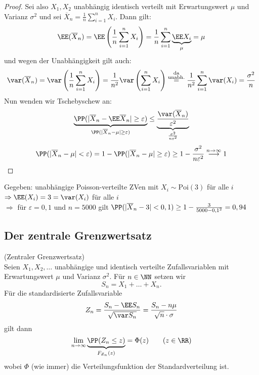 \documentclass{scrreprt}
\begin{document}
\begin{proof}
Sei also $X_1, X_2$ unabhängig identisch verteilt mit Erwartungswert $\mu$ und Varianz $\sigma^2$ und sei $\overline{X}_n=\frac{1}{n}\sum_{i=1}^nX_i$. Dann gilt:
$$ \EE(\overline{X}_n)=\EE\left(\frac{1}{n}\sum_{i=1}^nX_i\right) = \frac{1}{n}\sum_{i=1}^n\underbrace{\EE X_i}_\mu = \mu$$
und wegen der Unabhängigkeit gilt auch:
$$\var(\overline{X}_n)=\var\left(\frac{1}{n}\sum_{i=1}^n X_i\right) = \frac{1}{n^2}\var\left(\sum_{i=1}^nX_i\right) \overset{\substack{\text{da}\\\text{unabh.}}}{=}\frac{1}{n^2}\sum_{i=1}^n \var(X_i)=\frac{\sigma^2}{n}$$
Nun wenden wir Tschebyschew an:
$$\underbrace{\PP(|\overline{X}_n-\EE \overline{X}_n|\geq \varepsilon)}_{\PP(|\overline{X}_n-\mu|\geq \varepsilon)}\leq \underbrace{\frac{\var(\overline{X}_n)}{\varepsilon^2}}_{\frac{\sigma^2}{n \varepsilon^2}}$$
$$\PP(|\overline{X}_n-\mu| < \varepsilon) = 1-\PP(|\overline{X}_n-\mu | \geq \varepsilon) \geq 1-\frac{\sigma^2}{n\varepsilon^2}\overset{n\to \infty}{\longrightarrow} 1$$
\end{proof}

 Gegeben: unabhängige Poisson-verteilte ZVen mit $X_i \sim \mathrm{Poi}(3)$ für alle $i$\\
$\Rightarrow\EE (X_i) = 3 = \var(X_i)$ für alle $i$\\
$\Rightarrow$ für $\varepsilon = 0,1$ und $n=5000$ gilt $\PP(|\overline{X}_n-3|<0,1) \geq 1-\frac{3}{5000-0,1^2}=0,94$ 

\subsection{Der zentrale Grenzwertsatz}

 (Zentraler Grenzwertsatz)\\
Seien $X_1, X_2, \ldots$ unabhängige und identisch verteilte Zufallsvariablen mit Erwartungswert $\mu$ und Varianz $\sigma^2$. Für $n\in \NN$ setzen wir
$$S_n=X_1+\ldots+ X_n\text{.}$$
Für die standardisierte Zufallsvariable
$$Z_n=\frac{S_n-\EE S_n}{\sqrt{\var S_n}}=\frac{S_n - n \mu}{\sqrt{n}\cdot \sigma}$$
gilt dann
$$\lim_{n\to \infty} \underbrace{\PP(Z_n \leq z)}_{F_{Z_n}(z)} = \Phi (z) \qquad (z \in \RR)$$
wobei $\Phi$ (wie immer) die Verteilungsfunktion der Standardverteilung ist.
\end{document}
